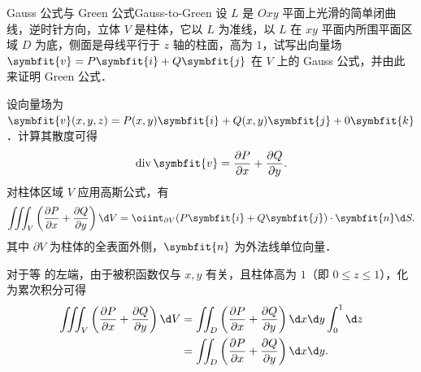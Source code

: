 \begin{problem}{Gauss 公式与 Green 公式}{Gauss-to-Green}
    设 $L$ 是 $Oxy$ 平面上光滑的简单闭曲线，逆时针方向，立体 $V$ 是柱体，它以 $L$ 为准线，以 $L$ 在 $xy$ 平面内所围平面区域 $D$ 为底，侧面是母线平行于 $z$ 轴的柱面，高为 $1$，试写出向量场 $\symbfit{v} = P\symbfit{i} + Q\symbfit{j}$ 在 $V$ 上的 Gauss 公式，并由此来证明 Green 公式．
\end{problem}

\begin{myproof}
    设向量场为 $\symbfit{v}(x,y,z) = P(x,y)\symbfit{i} + Q(x,y)\symbfit{j} + 0\symbfit{k}$．计算其散度可得
    \begin{equation}
        \label{eq:div-v}
        \operatorname{div} \symbfit{v} = \frac{\partial P}{\partial x} + \frac{\partial Q}{\partial y}.
    \end{equation}
    对柱体区域 $V$ 应用高斯公式，有
    \begin{equation}
        \label{eq:gauss-app}
        \iiint_V \left( \frac{\partial P}{\partial x} + \frac{\partial Q}{\partial y} \right) \d V = \oiint_{\partial V} (P \symbfit{i} + Q \symbfit{j}) \cdot \symbfit{n} \d S.
    \end{equation}
    其中 $\partial V$ 为柱体的全表面外侧，$\symbfit{n}$ 为外法线单位向量．

    对于等  的左端，由于被积函数仅与 $x,y$ 有关，且柱体高为 $1$（即 $0 \le z \le 1$），化为累次积分可得
    \begin{equation}
        \label{eq:lhs-eval}
        \begin{aligned}
            \iiint_V \left( \frac{\partial P}{\partial x} + \frac{\partial Q}{\partial y} \right) \d V & = \iint_D \left( \frac{\partial P}{\partial x} + \frac{\partial Q}{\partial y} \right) \d x \d y \int_0^1 \d z \\
                                                                                                       & = \iint_D \left( \frac{\partial P}{\partial x} + \frac{\partial Q}{\partial y} \right) \d x \d y.
        \end{aligned}
    \end{equation}


\end{myproof}
